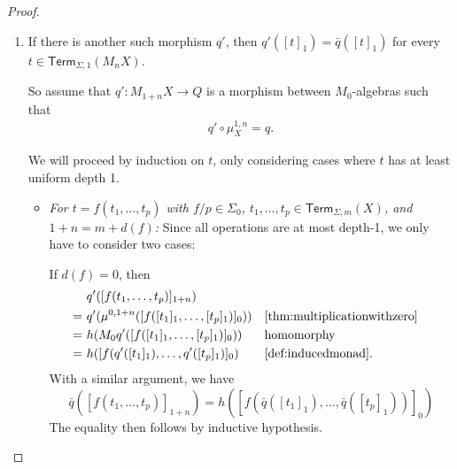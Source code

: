 \documentclass[a4paper,UKenglish,cleveref,thm-restate,numberwithinsect,final]{lipics-v2021}
\newcommand{\Term}{\mathsf{Term}}
\newcommand{\sig}{\Sigma}
\newcommand{\sigp}{\Sigma_0}
\theoremstyle{plain}
\newcommand{\id}{\mathit{id}}
\numberwithin{equation}{section}
\newcommand{\+}[1]{\mathcal{#1}\xspace}
\theoremstyle{definition}
\begin{document}
\begin{proof}
\begin{enumerate}[wide]
            It then follows that
            \begin{align*}
                \bar{q}(\mu^{1, n}_X([t]_1))
                &= \bar{q}([t\sigma]_{1 + n}) && \text{\cref{thm:multiplicationsplitting}} \\
                &= q([s^n_X(t\sigma)]_1) && \text{definition of } \bar{q} \\
                &= q([t\bar{\sigma}]_1) && \text{\cref{thm:coequalizerproperties} \eqref{itm:substitutionlemmadepth1}} \\
                &= q(M_1 \id([t]_1)) && \text{\cref{def:inducedmonad} because } \sigma_{\id} = \bar{\sigma} \\
                &= q([t]_1) && \text{functoriality of } M_1.
            \end{align*}
        \item \label{itm:coequalizerunique}
            If there is another such morphism \(q'\), then \(q'([t]_1) = \bar{q}([t]_1)\) for every \(t \in \Term_{\sig, 1}(M_n X)\).

            So assume that \(q': M_{1 + n} X \to Q\) is a morphism between \(M_0\)-algebras such that
            \begin{gather}
                q' \circ \mu^{1, n}_X = q. \label{eq:qprimehasproperty}
            \end{gather}

            We will proceed by induction on \(t\), only considering cases where \(t\) has at least uniform depth 1.
            \begin{itemize}
                \item
                    \textit{For \(t = f(t_1, \ldots, t_p)\) with \(f/p \in \sigp\), \(t_1, \ldots, t_p \in \Term_{\sig, m}(X)\), and \(1 + n = m + d(f)\):}
                    Since all operations are at most depth-1, we only have to consider two cases:

                    If \(d(f) = 0\), then
                    \begin{align*}
                        &q'([f(t_1, \ldots, t_p)]_{1 + n}) \\
                        =~&q'(\mu^{0, 1 + n}([f([t_1]_1, \ldots, [t_p]_1)]_0)) && \text{\cref{thm:multiplicationwithzero}} \\
                        =~&h(M_0 q'([f([t_1]_1, \ldots, [t_p]_1)]_0)) && \text{homomorphy} \\
                        =~&h([f(q'([t_1]_1), \ldots, q'([t_p]_1)]_0) && \text{\cref{def:inducedmonad}}.
                    \end{align*}
                    With a similar argument, we have
                    \[
                        \bar{q}([f(t_1, \ldots, t_p)]_{1 + n}) = h([f(\bar{q}([t_1]_1), \ldots, \bar{q}([t_p]_1))]_0)
                    \]
                    The equality then follows by inductive hypothesis.


\end{itemize}
\end{enumerate}
\end{proof}
\end{document}

